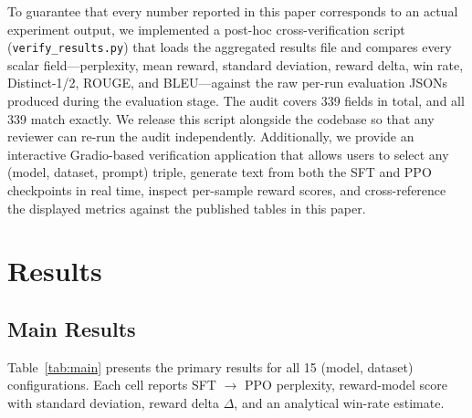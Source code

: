 \documentclass[10pt,twocolumn,letterpaper]{article}
\begin{document}
To guarantee that every number reported in this paper corresponds to an actual experiment output, we implemented a post-hoc cross-verification script (\texttt{verify\_results.py}) that loads the aggregated results file and compares every scalar field---perplexity, mean reward, standard deviation, reward delta, win rate, Distinct-1/2, ROUGE, and BLEU---against the raw per-run evaluation JSONs produced during the evaluation stage. The audit covers 339 fields in total, and all 339 match exactly. We release this script alongside the codebase so that any reviewer can re-run the audit independently. Additionally, we provide an interactive Gradio-based verification application that allows users to select any (model, dataset, prompt) triple, generate text from both the SFT and PPO checkpoints in real time, inspect per-sample reward scores, and cross-reference the displayed metrics against the published tables in this paper.

\section{Results}
\label{sec:results}

\subsection{Main Results}
\label{sec:main-results}

Table~\ref{tab:main} presents the primary results for all 15 (model, dataset) configurations. Each cell reports SFT $\to$ PPO perplexity, reward-model score with standard deviation, reward delta $\Delta$, and an analytical win-rate estimate.
\end{document}
